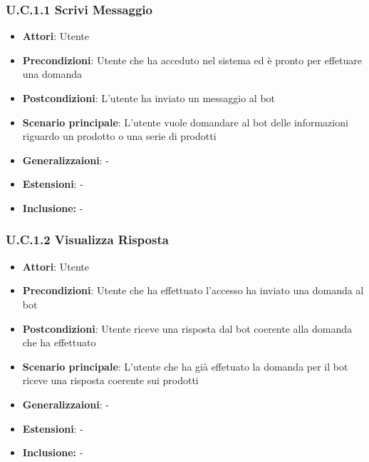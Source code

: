 \subsubsection{U.C.1.1 Scrivi Messaggio}
\begin{itemize}
    \item \textbf{Attori}: Utente
    \item \textbf{Precondizioni}: Utente che ha acceduto nel sistema ed è pronto per effetuare una domanda
    \item \textbf{Postcondizioni}: L'utente ha inviato un messaggio al bot
    \item \textbf{Scenario principale}: L’utente vuole domandare al bot delle informazioni riguardo un prodotto o una serie di prodotti
    \item \textbf{Generalizzaioni}: -
    \item \textbf{Estensioni}: -
    \item \textbf{Inclusione:} -
\end{itemize}
\subsubsection{U.C.1.2 Visualizza Risposta}
\begin{itemize}
    \item \textbf{Attori}: Utente
    \item \textbf{Precondizioni}: Utente che ha effettuato l'accesso ha inviato una domanda al bot
    \item \textbf{Postcondizioni}: Utente riceve una risposta dal bot coerente alla domanda che ha effettuato
    \item \textbf{Scenario principale}: L'utente che ha già effetuato la domanda per il bot riceve una risposta coerente sui prodotti
    \item \textbf{Generalizzaioni}: -
    \item \textbf{Estensioni}: -
    \item \textbf{Inclusione:} -
\end{itemize}
